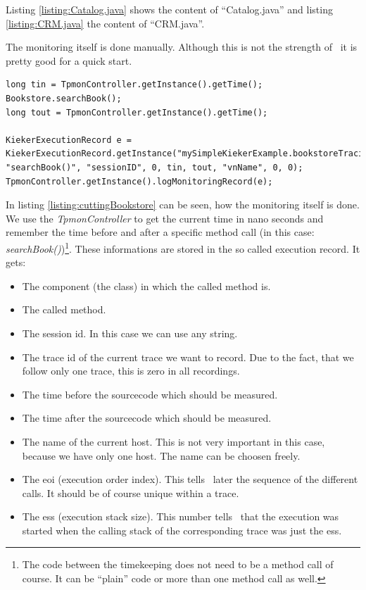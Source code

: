 \documentclass[a4paper, oneside, 11pt]{scrartcl}
\begin{document}
\setJavaCodeListing

\lstset{caption=Bookstore.java, label=listing:Bookstore.java}

Listing \ref{listing:Catalog.java} shows the content of ``Catalog.java'' and listing \ref{listing:CRM.java} the content of ``CRM.java''.
\lstset{caption=Catalog.java, label=listing:Catalog.java}

\lstset{caption=CRM.java, label=listing:CRM.java}


The monitoring itself is done manually. Although this is not the strength of \Kieker\ it is pretty good for a quick start.
\lstset{caption=Cutting from Bookstore.java, label=listing:cuttingBookstore}
\begin{lstlisting}
long tin = TpmonController.getInstance().getTime();
Bookstore.searchBook();
long tout = TpmonController.getInstance().getTime();

KiekerExecutionRecord e = KiekerExecutionRecord.getInstance("mySimpleKiekerExample.bookstoreTracing.Bookstore", "searchBook()", "sessionID", 0, tin, tout, "vnName", 0, 0);
TpmonController.getInstance().logMonitoringRecord(e);
\end{lstlisting}
In listing \ref{listing:cuttingBookstore} can be seen, how the monitoring itself is done. We use the \textit{TpmonController} to get the current time in nano seconds and remember the time before and after a specific method call (in this case: \textit{searchBook()})\footnote{The code between the timekeeping does not need to be a method call of course. It can be ``plain'' code or more than one method call as well.}. These informations are stored in the so called execution record. It gets:
\begin{itemize}
 \item The component (the class) in which the called method is.
 \item The called method.
 \item The session id. In this case we can use any string.
 \item The trace id of the current trace we want to record. Due to the fact, that we follow only one trace, this is zero in all recordings.
 \item The time before the sourcecode which should be measured.
 \item The time after the sourcecode which should be measured.
 \item The name of the current host. This is not very important in this case, because we have only one host. The name can be choosen freely.
 \item The eoi (execution order index). This tells \Kieker\ later the sequence of the different calls. It should be of course unique within a trace.
 \item The ess (execution stack size). This number tells \Kieker\ that the execution was started when the calling stack of the corresponding trace was just the ess.
\end{itemize}
\end{document}
